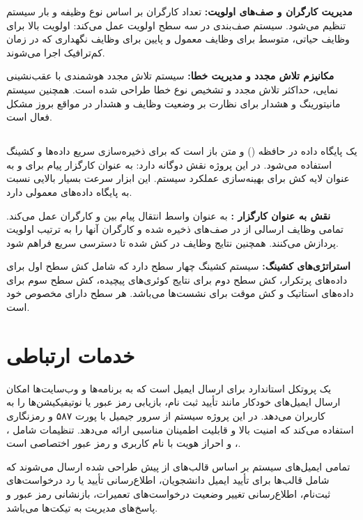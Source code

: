 \documentclass[12pt,a4paper]{report}
\begin{document}
	\textbf{مدیریت کارگران و صف‌های اولویت:} تعداد کارگران  بر اساس نوع وظیفه و بار سیستم تنظیم می‌شود. سیستم صف‌بندی در سه سطح اولویت عمل می‌کند: اولویت بالا برای وظایف حیاتی، متوسط برای وظایف معمول و پایین برای وظایف نگهداری که در زمان کم‌ترافیک اجرا می‌شوند.
	
	\textbf{مکانیزم تلاش مجدد و مدیریت خطا:} سیستم تلاش مجدد هوشمندی با عقب‌نشینی نمایی، حداکثر تلاش مجدد و تشخیص نوع خطا طراحی شده است. همچنین سیستم مانیتورینگ و هشدار برای نظارت بر وضعیت وظایف و هشدار در مواقع بروز مشکل فعال است.
	
	
	\subsection{}
	 یک پایگاه داده در حافظه () و متن باز است که برای ذخیره‌سازی سریع داده‌ها و کشینگ استفاده می‌شود. در این پروژه  نقش دوگانه دارد: به عنوان کارگزار پیام برای  و به عنوان لایه کش برای بهینه‌سازی عملکرد سیستم. این ابزار سرعت بسیار بالایی نسبت به پایگاه داده‌های معمولی دارد.
	
	\textbf{نقش  به عنوان کارگزار :} به عنوان واسط انتقال پیام بین  و کارگران  عمل می‌کند. تمامی وظایف ارسالی از  در صف‌های  ذخیره شده و کارگران آنها را به ترتیب اولویت پردازش می‌کنند. همچنین نتایج وظایف در  کش شده تا دسترسی سریع فراهم شود.
	
	\textbf{استراتژی‌های کشینگ:} سیستم کشینگ چهار سطح دارد که شامل کش سطح اول برای داده‌های پرتکرار، کش سطح دوم برای نتایج کوئری‌های پیچیده، کش سطح سوم برای داده‌های استاتیک و کش موقت برای نشست‌ها می‌باشد. هر سطح دارای  مخصوص خود است.
	
	
	\section{خدمات ارتباطی}
	 یک پروتکل استاندارد برای ارسال ایمیل است که به برنامه‌ها و وب‌سایت‌ها امکان ارسال ایمیل‌های خودکار مانند تأیید ثبت نام، بازیابی رمز عبور یا نوتیفیکیشن‌ها را به کاربران می‌دهد. در این پروژه سیستم از سرور  جیمیل با پورت ۵۸۷ و رمزنگاری  استفاده می‌کند که امنیت بالا و قابلیت اطمینان مناسبی ارائه می‌دهد. تنظیمات شامل ، ،  و احراز هویت با نام کاربری و رمز عبور اختصاصی است.
	
	تمامی ایمیل‌های سیستم بر اساس قالب‌های از پیش طراحی شده ارسال می‌شوند که شامل قالب‌ها برای تأیید ایمیل دانشجویان، اطلاع‌رسانی تأیید یا رد درخواست‌های ثبت‌نام، اطلاع‌رسانی تغییر وضعیت درخواست‌های تعمیرات، بازنشانی رمز عبور و پاسخ‌های مدیریت به تیکت‌ها می‌باشد.
	
\end{document}
